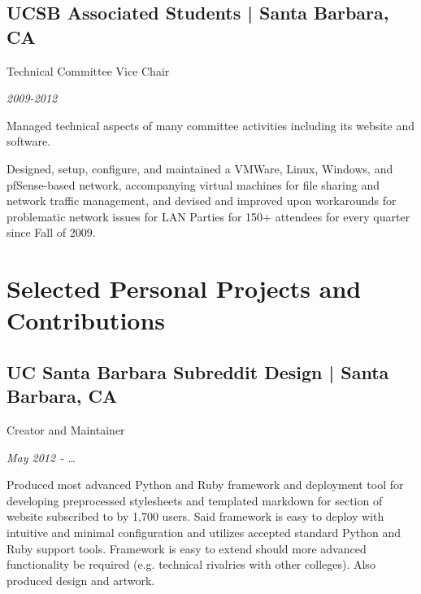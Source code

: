 \documentclass[10pt, letter]{article}
\newcommand{\years}[1]{\marginnote{#1}}
\renewcommand{\years}[1]{{\emph{#1}}}
\begin{document}
\begin{multicols}{2}
\subsection*{UCSB Associated Students | {\footnotesize{Santa Barbara, CA}}}

Technical Committee Vice Chair

\years{2009-2012}

Managed technical aspects of many committee activities including its website
and software.

Designed, setup, configure, and maintained a VMWare, Linux, Windows, and
pfSense-based network, accompanying virtual machines for file sharing and
network traffic management, and devised and improved upon workarounds for
problematic network issues for LAN Parties for 150+ attendees for every
quarter since Fall of 2009.





\section*{Selected Personal Projects and Contributions}

\subsection*{UC Santa Barbara Subreddit Design | {\footnotesize{Santa Barbara, CA}}}

Creator and Maintainer

\years{May 2012 - \ldots}

Produced most advanced Python and Ruby framework and deployment tool for
developing preprocessed stylesheets and templated markdown for section of
website subscribed to by 1,700 users. Said framework is easy to deploy with
intuitive and minimal configuration and utilizes accepted standard Python and
Ruby support tools. Framework is easy to extend should more advanced
functionality be required (e.g. technical rivalries with other colleges). Also
produced design and artwork.


\end{multicols}
\end{document}
